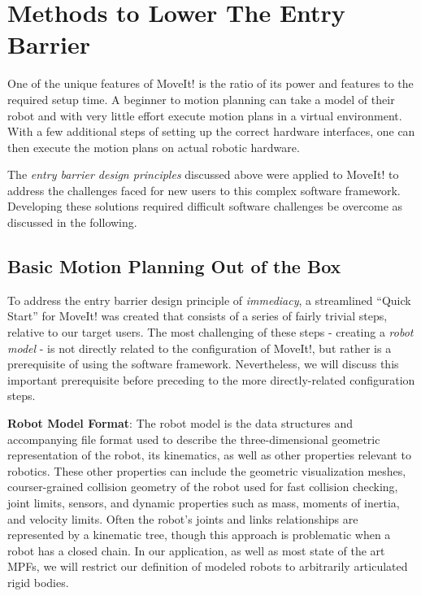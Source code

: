 \documentclass[10pt,journal,compsoc]{joser1}
\begin{document}
{\section{Methods to Lower The Entry Barrier}
\label{sec::lowering_barriers}

One of the unique features of MoveIt! is the ratio of its power and features to the required setup time. A beginner to motion planning can take a model of their robot and with very little effort execute motion plans in a virtual environment. With a few additional steps of setting up the correct hardware interfaces, one can then execute the motion plans on actual robotic hardware.

The \textit{entry barrier design principles} discussed above were applied to MoveIt! to address the challenges faced for new users to this complex software framework. Developing these solutions required difficult software challenges be overcome as discussed in the following.

\subsection{Basic Motion Planning Out of the Box}

To address the entry barrier design principle of \textit{immediacy}, a streamlined ``Quick Start'' for MoveIt! was created that consists of a series of fairly trivial steps, relative to our target users. The most challenging of these steps - creating a \textit{robot model} - is not directly related to the configuration of MoveIt!, but rather is a prerequisite of using the software framework. Nevertheless, we will discuss this important prerequisite before preceding to the more directly-related configuration steps. 

{\bf Robot Model Format}: The robot model is the data structures and accompanying file format used to describe the three-dimensional geometric representation of the robot, its kinematics, as well as other properties relevant to robotics. These other properties can include the geometric visualization meshes, courser-grained collision geometry of the robot used for fast collision checking, joint limits, sensors, and dynamic properties such as mass, moments of inertia, and velocity limits. Often the robot's joints and links relationships are represented by a kinematic tree, though this approach is problematic when a robot has a closed chain. In our application, as well as most state of the art MPFs, we will restrict our definition of modeled robots to arbitrarily articulated rigid bodies. 

}
\end{document}
